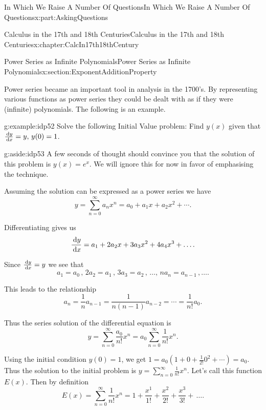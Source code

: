 \documentclass[oneside,10pt,]{book}
\numberwithin{equation}{section}
\newcommand{\dx}[1]{\,{\rm d}#1}
\begin{document}
\begin{partptx}{In Which We Raise A Number Of Questions}{}{In Which We Raise A Number Of Questions}{}{}{x:part:AskingQuestions}
\begin{chapterptx}{Calculus in the 17th and 18th Centuries}{}{Calculus in the 17th and 18th Centuries}{}{}{x:chapter:CalcIn17th18thCentury}
\begin{sectionptx}{Power Series as Infinite Polynomials}{}{Power Series as Infinite Polynomials}{}{}{x:section:ExponentAdditionProperty}
\par
Power series became an important tool in analysis in the 1700's.  By representing various functions as power series they could be dealt with as if they were (infinite) polynomials.  The following is an example.%
\begin{example}{}{g:example:idp52}%
Solve the following Initial Value problem: Find \(y(x)\) given that \(\frac{\dx{ y}}{\dx{ x}}=y,\,y(0)=1\).%
\begin{aside}{}{g:aside:idp53}%
A few seconds of thought should convince you that the solution of this problem is \(y(x) = e^x\).  We will ignore this for now in favor of emphasising the technique.%
\end{aside}
Assuming the solution can be expressed as a power series we have%
\begin{equation*}
y=\sum_{n=0}^\infty a_nx^n=a_0+a_1x+a_2x^2+\cdots\text{.}
\end{equation*}
%
\par
Differentiating gives us%
\begin{equation*}
\frac{\dx{ y}}{\dx{ x}}=a_1+2a_2x+3a_3x^2+4a_4x^3+\ldots\text{.}
\end{equation*}
%
\par
Since \(\frac{\dx{ y}}{\dx{ x}}=y\) we see that%
\begin{equation*}
a_1=a_0\,,\,2a_2=a_1\,,\,3a_3=a_2\,,\,\ldots,\,na_n=a_{n-1}\,,\ldots\text{.}
\end{equation*}
%
\par
This leads to the relationship%
\begin{equation*}
a_n=\frac{1}{n}a_{n-1}=\frac{1}{n(n-1)}a_{n-2}=\cdots=\frac{1}{n!}a_0\text{.}
\end{equation*}
%
\par
Thus the series solution of the differential equation is%
\begin{equation*}
y=\sum_{n=0}^\infty\frac{a_0}{n!}x^n=a_0\sum_{n=0}^\infty\frac{1}{n!}x^n\text{.}
\end{equation*}
%
\par
Using the initial condition \(y(0)=1\), we get \(1=a_0(1+0+\frac{1}{2!}0^2+\cdots)=a_0\). Thus the solution to the initial problem is \(y=\sum_{n=0}^\infty\frac{1}{n!}x^n\). Let's call this function \(E(x)\). Then by definition%
\begin{equation*}
E(x)=\sum_{n=0}^\infty\frac{1}{n!}x^n=1+\frac{x^1}{1!}+\frac{x^2}{2!}+\frac{x^3}{3!}+\,\ldots\text{.}
\end{equation*}
%
\end{example}

\end{sectionptx}
\end{chapterptx}
\end{partptx}
\end{document}

